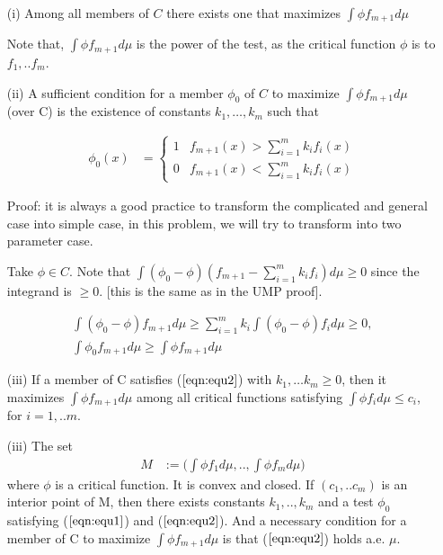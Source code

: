 \begin{itemize}

\item[(i)] Among all members of $C$ there exists one that maximizes $\int \phi f_{m+1} d\mu$

Note that, $\int \phi f_{m+1} d\mu$ is the power of the test, as the critical function $\phi$ is to $f_1,.. f_m$.

\item[(ii)] A sufficient condition for a member $\phi_0$ of $C$ to maximize $\int \phi f_{m+1} d\mu$ (over C) is the existence of constants $k_1, …, k_m$ such that

\begin{align}
	\label{eqn:equ2}
	\phi_0(x) &=  \begin{cases}
	1 & f_{m+1}(x) > \sum_{i=1}^m k_i f_i(x) \\
	0 &  f_{m+1}(x) < \sum_{i=1}^m k_i f_i(x)
	\end{cases}
\end{align}


Proof: it is always a good practice to transform the complicated and general case into simple case, in this problem, we will try to transform into two parameter case.

Take $\phi \in C$. Note that $\int (\phi_0 - \phi) (f_{m+1} - \sum_{i=1}^m k_i f_i) d\mu \geq 0$ since the integrand is $\geq 0$. [this is the same as in the UMP proof].

\begin{align*}
\int (\phi_0 - \phi) f_{m+1} d\mu \geq \sum_{i=1}^m k_i \int (\phi_0- \phi) f_i d\mu \geq 0, \\
\int \phi_0 f_{m+1} d\mu \geq \int \phi f_{m+1} d\mu
\end{align*}

\item[(iii)] If a member of C satisfies ($\ref{eqn:equ2}$) with $k_1, …k_m \geq 0$, then it maximizes $\int \phi f_{m+1} d\mu$ among all critical functions satisfying $\int \phi f_i d\mu \leq c_i$, for $i= 1,..m$.

\item[(iii)] The set 
\begin{align*}
	M &:=\Big ( \int \phi f_1 d\mu, .., \int \phi f_m d\mu \Big) 
\end{align*}
where $\phi$ is a critical function. It is convex and closed. If $(c_1,.. c_m)$ is an interior point of M, then there exists constants $k_1, .., k_m$ and a test $\phi_0$ satisfying ($\ref{eqn:equ1}$) and ($\ref{eqn:equ2}$). And a necessary condition for a member of C to maximize $\int \phi f_{m+1} d\mu$ is that ($\ref{eqn:equ2}$) holds a.e. $\mu$.


\end{itemize}


